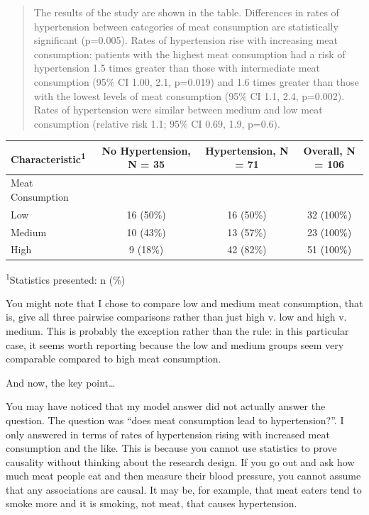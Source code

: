 \documentclass[]{book}
\begin{document}
\begin{quote}
The results of the study are shown in the table. Differences in rates of hypertension between categories of meat consumption are statistically significant (p=0.005). Rates of hypertension rise with increasing meat consumption: patients with the highest meat consumption had a risk of hypertension 1.5 times greater than those with intermediate meat consumption (95\% CI 1.00, 2.1, p=0.019) and 1.6 times greater than those with the lowest levels of meat consumption (95\% CI 1.1, 2.4, p=0.002). Rates of hypertension were similar between medium and low meat consumption (relative risk 1.1; 95\% CI 0.69, 1.9, p=0.6).
\end{quote}

\captionsetup[table]{labelformat=empty,skip=1pt}
\begin{longtable}{lccc}
\toprule
\textbf{Characteristic}\textsuperscript{1} & \textbf{No Hypertension}, N = 35 & \textbf{Hypertension}, N = 71 & \textbf{Overall}, N = 106 \\ 
\midrule
Meat Consumption &  &  &  \\ 
Low & 16 (50\%) & 16 (50\%) & 32 (100\%) \\ 
Medium & 10 (43\%) & 13 (57\%) & 23 (100\%) \\ 
High & 9 (18\%) & 42 (82\%) & 51 (100\%) \\ 
\bottomrule
\end{longtable}
\vspace{-5mm}
\begin{minipage}{\linewidth}
\textsuperscript{1}Statistics presented: n (\%) \\ 
\end{minipage}

You might note that I chose to compare low and medium meat consumption, that is, give all three pairwise comparisons rather than just high v. low and high v. medium. This is probably the exception rather than the rule: in this particular case, it seems worth reporting because the low and medium groups seem very comparable compared to high meat consumption.

And now, the key point\ldots{}

You may have noticed that my model answer did not actually answer the question. The question was ``does meat consumption lead to hypertension?''. I only answered in terms of rates of hypertension rising with increased meat consumption and the like. This is because you cannot use statistics to prove causality without thinking about the research design. If you go out and ask how much meat people eat and then measure their blood pressure, you cannot assume that any associations are causal. It may be, for example, that meat eaters tend to smoke more and it is smoking, not meat, that causes hypertension.
\end{document}
